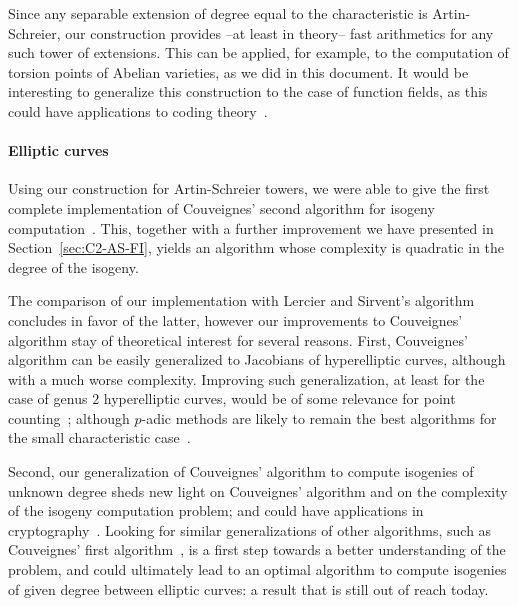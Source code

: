 Since any separable extension of degree equal to the characteristic is
Artin-Schreier, our construction provides --at least in theory-- fast
arithmetics for any such tower of extensions.  This can be applied,
for example, to the computation of torsion points of Abelian
varieties, as we did in this document. It would be interesting to
generalize this construction to the case of function fields, as this
could have applications to coding
theory~\cite{garcia+stichtenoth96,shum-et-al01}.

\paragraph{Elliptic curves}
Using our construction for Artin-Schreier towers, we were able to give
the first complete implementation of Couveignes' second algorithm for
isogeny computation~\cite{couveignes96}. This, together with a further
improvement we have presented in Section~\ref{sec:C2-AS-FI}, yields an
algorithm whose complexity is quadratic in the degree of the isogeny.

The comparison of our implementation with Lercier and Sirvent's
algorithm~\cite{lercier+sirvent08} concludes in favor of the latter,
however our improvements to Couveignes' algorithm stay of theoretical
interest for several reasons. First, Couveignes' algorithm can be
easily generalized to Jacobians of hyperelliptic curves, although with
a much worse complexity. Improving such generalization, at least for
the case of genus $2$ hyperelliptic curves, would be of some relevance
for point counting~\cite{schoof95,pila90,gaudry+schost04}; although
$p$-adic methods are likely to remain the best algorithms for the
small characteristic
case~\cite{kedlaya01,denef+vercauteren06}. 

Second, our generalization of Couveignes' algorithm to compute
isogenies of unknown degree sheds new light on Couveignes' algorithm
and on the complexity of the isogeny computation problem; and could
have applications in
cryptography~\cite{teske06,rostovtsev+stolbunov06}.  Looking for
similar generalizations of other algorithms, such as Couveignes' first
algorithm~\cite{couveignes94}, is a first step towards a better
understanding of the problem, and could ultimately lead to an optimal
algorithm to compute isogenies of given degree between elliptic
curves: a result that is still out of reach today.


